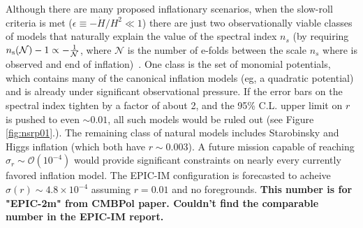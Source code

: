 Although there are many proposed inflationary scenarios, when the slow-roll criteria is met ($\epsilon\equiv-\dot{H}/H^2\ll1$) there are just two observationally viable classes of models that naturally explain the value of the spectral index $n_s$ (by requiring $n_{\rm s}(\mathcal{N})-1\propto-\frac{1}{\mathcal{N}}$, where $\mathcal{N}$ is the number of e-folds between the scale $n_s$ where is observed and end of inflation)~\cite{Mukhanov:2013tua,Roest:2013fha,Creminelli:2014nqa}. One class is the set of monomial potentials, which contains many of the canonical inflation models (eg, a quadratic potential) and is already under significant observational pressure. If the error bars on the spectral index tighten by a factor of about 2, and the 95\% C.L. upper limit on $r$ is pushed to even $\sim0.01$, all such models would be ruled out (see Figure \ref{fig:nsrp01}.). The remaining class of natural models includes Starobinsky and Higgs inflation (which both have $r\sim0.003$). A future mission capable of reaching $\sigma_r\sim\mathcal{O}(10^{-4})$ would provide significant constraints on nearly every currently favored inflation model. The EPIC-IM configuration is forecasted to acheive $\sigma(r)\sim4.8 \times 10^{-4}$ assuming $r=0.01$ and no foregrounds. {\bf This number is for "EPIC-2m" from CMBPol paper. Couldn't find the comparable number in the EPIC-IM report.}
